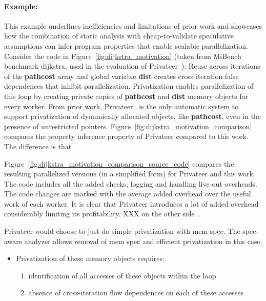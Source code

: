 \paragraph{Example:}
This example underlines inefficiencies and limitations of prior work and
showcases how the combination of static analysis with cheap-to-validate
speculative assumptions can infer program properties that enable scalable
parallelization.
%
Consider the code in
Figure~\ref{fig:dijkstra_motivation} (taken from MiBench~\cite{} benchmark
dijkstra, used in the evaluation of Privateer~\cite{}).
%
Reuse across iterations of the \textbf{pathcost} array and global variable
\textbf{dist} creates cross-iteration false dependences that inhibit
parallelization.
%
Privatization enables parallelization of this loop by creating private
copies of \textbf{pathcost} and \textbf{dist} memory objects for every
worker.
%
From prior work, Privateer~\cite{johnson:12:pldi} is the only automatic
system to support privatization of dynamically allocated objects, like
\textbf{pathcost}, even in the presence of unrestricted pointers.
%
Figure~\ref{fig:dijkstra_motivation_comparison} compares the property
inference property of Privateer compared to this work.
The difference is that

Figure~\ref{fig:dijkstra_motivation_comparison_source_code} compares the
resulting parallelized versions (in a simplified form) for Privateer and
this work. The code includes all the added checks, logging and handling
live-out overheads. The code changes are marked with the average added
overhead over the useful work of each worker.
It is clear that Privateer introduces a lot of added overhead considerably
limiting its profitability. XXX on the other side ..


Privateer would choose to just do simple privatization with mem spec.
The spec-aware analyzer allows removal of mem spec and efficient
privatization in this case.

\begin{itemize}
\item
Privatization of these memory objects requires:
\begin{enumerate}
\item
identification of all accesses of these objects
    within the loop
\item
absence of cross-iteration flow
     dependences on each of these accesses
\end{enumerate}

\end{itemize}


